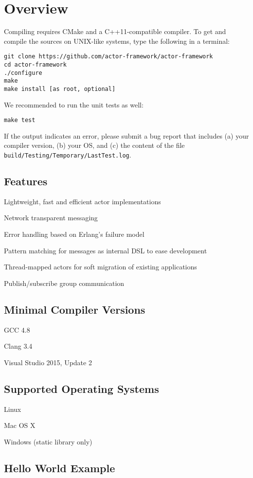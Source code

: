 \section{Overview}

Compiling \lib requires CMake and a C++11-compatible compiler. To get and compile the sources on UNIX-like systems, type the following in a terminal:

\begin{verbatim}
git clone https://github.com/actor-framework/actor-framework
cd actor-framework
./configure
make
make install [as root, optional]
\end{verbatim}

We recommended to run the unit tests as well:

\begin{verbatim}
make test
\end{verbatim}

If the output indicates an error, please submit a bug report that includes (a) your compiler version, (b) your OS, and (c) the content of the file \texttt{build/Testing/Temporary/LastTest.log}.

\subsection{Features}

\begin{itemize*}
  \item Lightweight, fast and efficient actor implementations
  \item Network transparent messaging
  \item Error handling based on Erlang's failure model
  \item Pattern matching for messages as internal DSL to ease development
  \item Thread-mapped actors for soft migration of existing applications
  \item Publish/subscribe group communication
\end{itemize*}


\subsection{Minimal Compiler Versions}

\begin{itemize*}
  \item GCC 4.8
  \item Clang 3.4
  \item Visual Studio 2015, Update 2
\end{itemize*}

\subsection{Supported Operating Systems}

\begin{itemize*}
\item Linux
\item Mac OS X
\item Windows (static library only)
\end{itemize*}

\clearpage
\subsection{Hello World Example}


